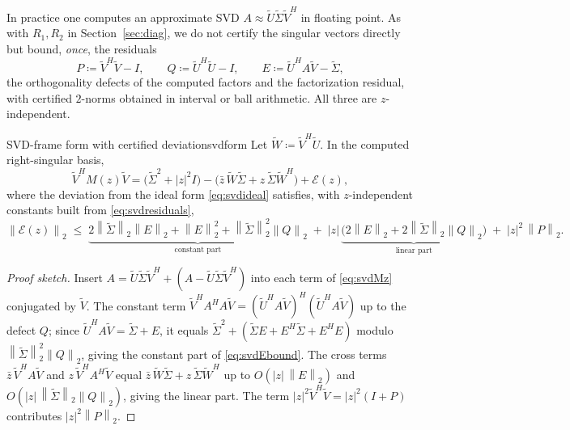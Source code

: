 \documentclass[11pt, a4paper]{article}
\numberwithin{equation}{section}
\newcommand{\norm}[1]{\left\|#1\right\|}
\newcommand{\abs}[1]{\left|#1\right|}
\newcommand{\tU}{\widetilde{U}}
\newcommand{\tV}{\widetilde{V}}
\newcommand{\tSig}{\widetilde{\Sigma}}
\newcommand{\tW}{\widetilde{W}}
\begin{document}
In practice one computes an approximate SVD $A \approx \tU\tSig\tV^H$ in floating
point.  As with $R_1, R_2$ in Section~\ref{sec:diag}, we do not certify the
singular vectors directly but bound, \emph{once}, the residuals
\begin{equation}\label{eq:svdresiduals}
  P \coloneqq \tV^H\tV - I, \qquad
  Q \coloneqq \tU^H\tU - I, \qquad
  E \coloneqq \tU^H A \tV - \tSig,
\end{equation}
the orthogonality defects of the computed factors and the factorization
residual, with certified $2$-norms obtained in interval or ball arithmetic.  All
three are $z$-independent.

\begin{lemma}{SVD-frame form with certified deviation}{svdform}
  Let $\tW \coloneqq \tV^H\tU$.  In the computed right-singular basis,
  \[
    \tV^H M(z) \tV
      = \bigl(\tSig^2 + \abs{z}^2 I\bigr)
        - \bigl(\bar z\,\tW\tSig + z\,\tSig\tW^H\bigr)
        + \mathcal{E}(z),
  \]
  where the deviation from the ideal form \eqref{eq:svdideal} satisfies, with
  $z$-independent constants built from \eqref{eq:svdresiduals},
  \begin{equation}\label{eq:svdEbound}
    \norm{\mathcal{E}(z)}_2
      \;\le\; \underbrace{2\norm{\tSig}_2\norm{E}_2 + \norm{E}_2^2
              + \norm{\tSig}_2^2\norm{Q}_2}_{\text{constant part}}
      \;+\; \abs{z}\,\underbrace{\bigl(2\norm{E}_2 + 2\norm{\tSig}_2\norm{Q}_2\bigr)}_{\text{linear part}}
      \;+\; \abs{z}^2\,\norm{P}_2.
  \end{equation}
\end{lemma}

\begin{proof}[Proof sketch]
Insert $A = \tU\tSig\tV^H + (A - \tU\tSig\tV^H)$ into each term of
\eqref{eq:svdMz} conjugated by $\tV$.  The constant term $\tV^H A^H A\tV =
(\tU^H A\tV)^H(\tU^H A\tV)$ up to the defect $Q$; since $\tU^H A\tV = \tSig + E$,
it equals $\tSig^2 + (\tSig E + E^H\tSig + E^H E)$ modulo
$\norm{\tSig}_2^2\norm{Q}_2$, giving the constant part of \eqref{eq:svdEbound}.
The cross terms $\bar z\,\tV^H A\tV$ and $z\,\tV^H A^H\tV$ equal $\bar
z\,\tW\tSig + z\,\tSig\tW^H$ up to $O(\abs z\,\norm{E}_2)$ and $O(\abs
z\,\norm{\tSig}_2\norm{Q}_2)$, giving the linear part.  The term $\abs z^2\tV^H
\tV = \abs z^2(I + P)$ contributes $\abs z^2\norm{P}_2$.
\end{proof}
\end{document}
